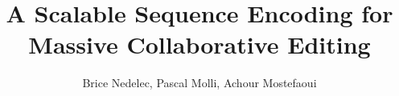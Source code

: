 \documentclass{sig-alternate}
\begin{document}
\title{A Scalable Sequence Encoding for Massive Collaborative Editing}

\author{
     \alignauthor Brice Nedelec, Pascal Molli, Achour Mostefaoui\\
     \\
     \\
}

\maketitle















\raggedright


\appendix


\end{document}
